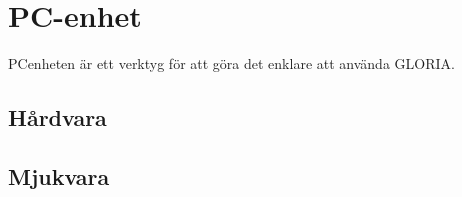 
\section{PC-enhet}
PCenheten är ett verktyg för att göra det enklare att använda GLORIA.

\subsection{Hårdvara}

\subsection{Mjukvara}
